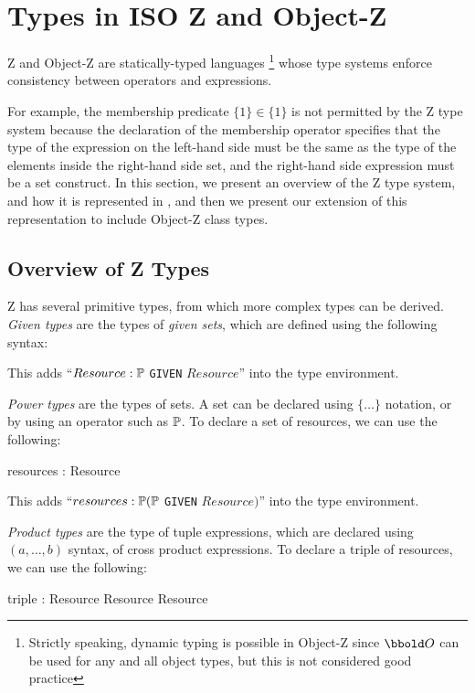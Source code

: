 \section{Types in ISO Z and Object-Z}

Z and Object-Z are statically-typed languages
\footnote{Strictly speaking, dynamic typing is possible in Object-Z
since $\oid$ can be used for any and all object types, but this is not
considered good practice} whose type systems enforce consistency
between operators and expressions.

For example, the membership predicate $\{1\} \in \{1\}$ is not
permitted by the Z type system because the declaration of the
membership operator specifies that the type of the expression on the
left-hand side must be the same as the type of the elements inside the
right-hand side set, and the right-hand side expression must be a set
construct.  In this section, we present an overview of the Z type
system, and how it is represented in \theStandard, and then we present
our extension of this representation to include Object-Z class types.

\subsection{Overview of Z Types}

Z has several primitive types, from which more complex types can be
derived. {\em Given types} are the types of {\em given sets}, which are
defined using the following syntax:
\begin{zed}
  [Resource]
\end{zed}

This adds ``$Resource : \power$ {\tt GIVEN} $Resource$'' into the type
environment.

{\em Power types} are the types of sets. A set can be declared using
$\{\ldots\}$ notation, or by using an operator such as $\power$. To
declare a set of resources, we can use the following:
\begin{axdef}
  resources : \power Resource
\end{axdef}

This adds ``$resources : \power (\power$ {\tt GIVEN}
$Resource)$'' into the type environment.

{\em Product types} are the type of tuple expressions, which are
declared using $(a, \ldots, b)$ syntax, of cross product expressions. To
declare a triple of resources, we can use the following:
\begin{axdef}
   triple : Resource \cross Resource \cross Resource
\end{axdef}

